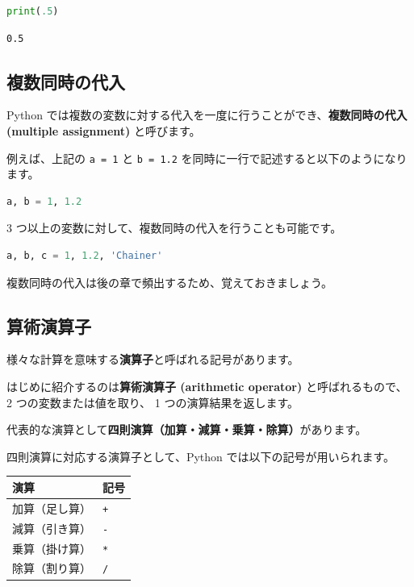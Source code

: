 \begin{lstlisting}[style=codecell,language=Python]
print(.5)
\end{lstlisting}

\begin{lstlisting}[style=outputcell]
0.5
\end{lstlisting}

\subsection{複数同時の代入}


Python では複数の変数に対する代入を一度に行うことができ、\textbf{複数同時の代入 (multiple assignment)} と呼びます。

例えば、上記の \texttt{a = 1} と \texttt{b = 1.2} を同時に一行で記述すると以下のようになります。


\begin{lstlisting}[style=codecell,language=Python]
a, b = 1, 1.2
\end{lstlisting}

3 つ以上の変数に対して、複数同時の代入を行うことも可能です。


\begin{lstlisting}[style=codecell,language=Python]
a, b, c = 1, 1.2, 'Chainer'
\end{lstlisting}

複数同時の代入は後の章で頻出するため、覚えておきましょう。


\subsection{算術演算子}


様々な計算を意味する\textbf{演算子}と呼ばれる記号があります。

はじめに紹介するのは\textbf{算術演算子 (arithmetic operator)} と呼ばれるもので、 2 つの変数または値を取り、 1 つの演算結果を返します。


代表的な演算として\textbf{四則演算（加算・減算・乗算・除算）}があります。

四則演算に対応する演算子として、Python では以下の記号が用いられます。


\begin{center}
\begin{tabular}{|l|l|}
\hline
演算 & 記号 \\
\hline
加算（足し算） & \texttt{+} \\
減算（引き算） & \texttt{-} \\
乗算（掛け算） & \texttt{*} \\
除算（割り算） & \texttt{/} \\
\hline
\end{tabular}
\end{center}


